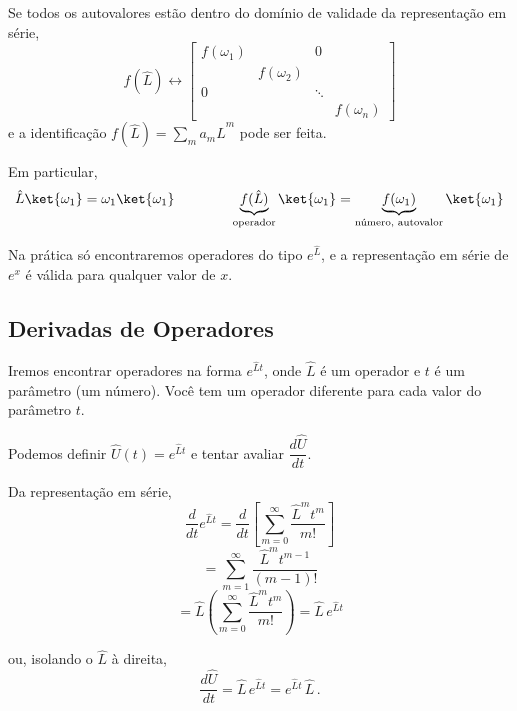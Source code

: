 Se todos os autovalores estão dentro do domínio de validade da representação em série,
\begin{equation}
    f(\hat{L}) \leftrightarrow
    \begin{bmatrix}
        f(\omega_1) & & 0 \\
        & f(\omega_2) & \\
        0 & & \ddots \\
        & & & f(\omega_n)
    \end{bmatrix}
\end{equation}
e a identificação $f(\hat{L}) = \displaystyle\sum_m a_m \hat{L}^m$ pode ser feita.

Em particular,
\begin{equation}
    \hat{L}\ket{\omega_1} = \omega_1 \ket{\omega_1} \qquad\qquad \underbrace{f(\hat{L})}_{\text{operador}} \ket{\omega_1} = \underbrace{f(\omega_1)}_{\text{número, autovalor}} \ket{\omega_1}
\end{equation}

Na prática só encontraremos operadores do tipo $e^{\hat{L}}$, e a representação em série de $e^x$ é válida para qualquer valor de $x$.

\subsection*{Derivadas de Operadores}

Iremos encontrar operadores na forma $e^{\hat{L}t}$, onde $\hat{L}$ é um operador e $t$ é um parâmetro (um número). Você tem um operador diferente para cada valor do parâmetro $t$.

Podemos definir $\hat{U}(t) = e^{\hat{L}t}$ e tentar avaliar $\dfrac{d\hat{U}}{dt}$.

Da representação em série,
\begin{equation}
    \frac{d}{dt} e^{\hat{L}t} = \frac{d}{dt}\left[\sum_{m=0}^{\infty} \frac{\hat{L}^m t^m}{m!}\right]
\end{equation}
\begin{equation}
    = \sum_{m=1}^{\infty} \frac{\hat{L}^m t^{m-1}}{(m-1)!}
\end{equation}
\begin{equation}
    = \hat{L}\left(\sum_{m=0}^{\infty} \frac{\hat{L}^m t^m}{m!}\right) = \hat{L}\, e^{\hat{L}t}
\end{equation}

ou, isolando o $\hat{L}$ à direita,
\begin{equation}
    \label{eq:aula6_derivada_U}
    \frac{d\hat{U}}{dt} = \hat{L}\, e^{\hat{L}t} = e^{\hat{L}t}\, \hat{L} \, .
\end{equation}

